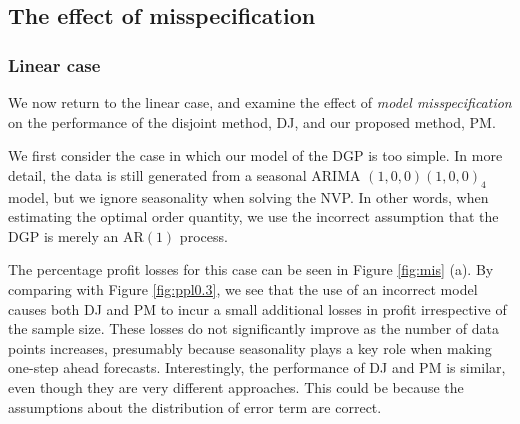 \documentclass{article}
\begin{document}
\subsection{The effect of misspecification} \label{sub:exp3}
\subsubsection{Linear case}

We now return to the linear case, and examine the effect of
\emph{model misspecification} on the performance of the disjoint method,
DJ, and our proposed method, PM.

We first consider the case in which our model of the DGP is too simple.
In more detail, the data is still generated from a seasonal ARIMA $(1,0,0)(1,0,0)_4$ model, but we ignore seasonality when solving the NVP. In other words, when estimating the optimal order quantity, we use the incorrect assumption that the DGP is merely an AR$(1)$ process. %

The percentage profit losses for this case can be seen in Figure
\ref{fig:mis} (a). By comparing with Figure \ref{fig:ppl0.3}, we see that the use of an incorrect model causes both DJ and PM to incur a small additional losses in profit irrespective of the sample size. These losses do not significantly improve as the number of data points increases, presumably because seasonality plays a key role when making one-step ahead forecasts. Interestingly, the performance of DJ and PM is similar, even though they are very different approaches. This could be because the assumptions about the distribution of error term are correct.
\end{document}

